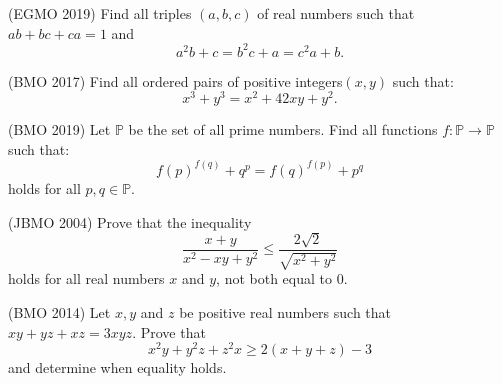 \documentclass[11pt]{scrartcl}
\begin{document}
        \begin{soalbaru}(EGMO 2019)
    Find all triples $(a, b, c)$ of real numbers such that $ab + bc + ca = 1$ and $$a^2b + c = b^2c + a = c^2a + b.$$
    \end{soalbaru}
    
    \begin{soalbaru}(BMO 2017)
    Find all ordered pairs of positive integers$ (x, y)$ such that:$$x^3+y^3=x^2+42xy+y^2.$$
    \end{soalbaru}
    
    
    \begin{soalbaru}(BMO 2019)
    Let $\mathbb{P}$ be the set of all prime numbers. Find all functions $f:\mathbb{P}\rightarrow\mathbb{P}$ such that:
$$f(p)^{f(q)}+q^p=f(q)^{f(p)}+p^q$$holds for all $p,q\in\mathbb{P}$.
    \end{soalbaru}

    
    \begin{soalbaru}(JBMO 2004)
    Prove that the inequality\[ \frac{ x+y}{x^2-xy+y^2 } \leq \frac{ 2\sqrt 2 }{\sqrt{ x^2 +y^2 } } \]holds for all real numbers $x$ and $y$, not both equal to 0.
    \end{soalbaru}
    
    \begin{soalbaru}(BMO 2014)
    Let $x,y$ and $z$ be positive real numbers such that $xy+yz+xz=3xyz$. Prove that\[ x^2y+y^2z+z^2x \ge 2(x+y+z)-3 \]and determine when equality holds.
    \end{soalbaru}
\end{document}
